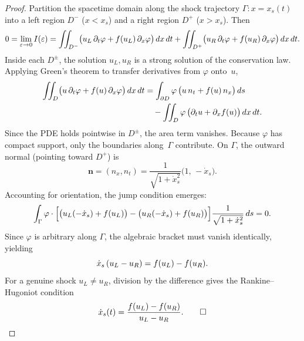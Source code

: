 \begin{proof}
Partition the spacetime domain along the shock trajectory $\Gamma\!: x = x_{s}(t)$ into a
left region $D^{-}$ ($x < x_{s}$) and a right region $D^{+}$ ($x > x_{s}$).
Then
\begin{equation}
\label{eq:limit-split}
0 = \lim_{\varepsilon\to0} I(\varepsilon)
  = \iint_{D^{-}} \bigl( u_{L}\,\partial_{t}\varphi + f(u_{L})\,\partial_{x}\varphi \bigr)
    \,dx\,dt
  + \iint_{D^{+}} \bigl( u_{R}\,\partial_{t}\varphi + f(u_{R})\,\partial_{x}\varphi \bigr)
    \,dx\,dt.
\end{equation}
Inside each $D^{\pm}$, the solution $u_{L},u_{R}$ is a strong solution of the conservation law.
Applying Green's theorem to transfer derivatives from $\varphi$ onto~$u$,
\begin{equation}
\label{eq:green}
\begin{aligned}
\iint_D \bigl( u\,\partial_{t}\varphi + f(u)\,\partial_{x}\varphi \bigr) \,dx\,dt
&= \int_{\partial D}
   \varphi\,\bigl( u\,n_{t} + f(u)\,n_{x} \bigr)\,ds \\
&\quad - \iint_D \varphi\,\bigl( \partial_{t}u + \partial_{x}f(u) \bigr) \,dx\,dt.
\end{aligned}
\end{equation}
Since the PDE holds pointwise in $D^{\pm}$, the area term vanishes.
Because $\varphi$ has compact support, only the boundaries along~$\Gamma$ contribute.
On $\Gamma$, the outward normal (pointing toward $D^{+}$) is
\begin{equation}
\mathbf{n} = (n_{x}, n_{t})
           = \frac{1}{\sqrt{1 + \dot x_{s}^{2}}}
             \bigl( 1,\, -\dot x_{s} \bigr).
\end{equation}
Accounting for orientation, the jump condition emerges:
\begin{equation}
\label{eq:jump-cond}
\int_{\Gamma} \varphi \cdot
\Bigl[
  \bigl( u_{L}(-\dot x_{s}) + f(u_{L}) \bigr)
  - \bigl( u_{R}(-\dot x_{s}) + f(u_{R}) \bigr)
\Bigr]
\frac{1}{\sqrt{1 + \dot x_{s}^{2}}}
\,ds = 0.
\end{equation}
Since $\varphi$ is arbitrary along $\Gamma$, the algebraic bracket must vanish identically,
yielding
\begin{equation}
\dot x_{s}\,(u_{L} - u_{R}) = f(u_{L}) - f(u_{R}).
\end{equation}
For a genuine shock $u_{L} \neq u_{R}$, division by the difference gives the
Rankine--Hugoniot condition
\begin{equation}
\label{eq:rh-derived}
\dot x_{s}(t) = \frac{f(u_{L}) - f(u_{R})}{u_{L} - u_{R}}.
\qquad\square
\end{equation}


\end{proof}
